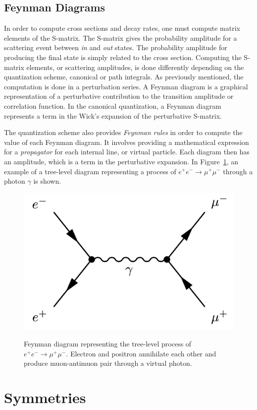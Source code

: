 \subsection{Feynman Diagrams}

In order to compute cross sections and decay rates, one must compute matrix elements of the S-matrix. The S-matrix gives the probability amplitude for a scattering event between \emph{in} and \emph{out} states. The probability amplitude for producing the final state is simply related to the cross section. Computing the S-matrix elements, or scattering amplitudes, is done differently depending on the quantization scheme, canonical or path integrals. As previously mentioned, the computation is done in a perturbation series. A Feynman diagram is a graphical representation of a perturbative contribution to the transition amplitude or correlation function. In the canonical quantization, a Feynman diagram represents a term in the Wick's expansion of the perturbative S-matrix. 

The quantization scheme also provides \emph{Feynman rules} in order to compute the value of each Feynman diagram. It involves providing a mathematical expression for a \emph{propagator} for each internal line, or virtual particle. Each diagram then has an amplitude, which is a term in the perturbative expansion. In Figure~\ref{fig:e-to-mu-feynman}, an example of a tree-level diagram representing a process of $e^+ e^- \rightarrow \mu^+ \mu^-$ through a photon $\gamma$ is shown.

\begin{figure}[!htb]
\centering
\includegraphics[width=0.5\linewidth]{plots/feynman_diagrams/feynman_e_to_mu.png}  \\
\caption[Electrons to Muons Feynman diagram]{Feynman diagram representing the tree-level process of $e^+ e^- \rightarrow \mu^+ \mu^-$. Electron and positron annihilate each other and produce muon-antimuon pair through a virtual photon.}
\label{fig:e-to-mu-feynman}
\end{figure}

\clearpage
\section{Symmetries}

